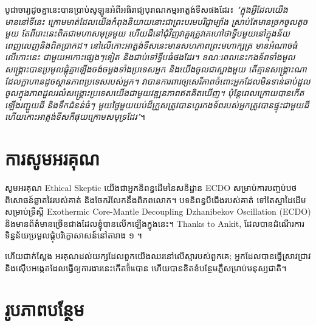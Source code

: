 \documentclass[10pt,twocolumn,letterpaper]{article}
\begin{document}
បូជាចារ្យដូចគ្នានេះបានប្រាប់សូឡូនអំពីអធិរាជ្យបុរាណកម្មអាត្លង់ទីសផងដែរ៖ \textit{"ក្នុងអ្វីដែលយើងមាននៅទីនេះ ក្រោមមាត់ដែលយើងកំពុងនិយាយនោះជាព្រះបរមបរិជ្ញាម្យ៉ាង ស្រាប់តែមានច្រកចូលតូចមួយ តែពីរោះនេះពិតជាមហាសមុទ្រមួយ ហើយដីនៅជុំវិញវាគួរត្រូវគេហៅថាទ្វីបមួយនៅក្នុងន័យពេញលេញនិងពិតប្រាកដ។ នៅលើកោះអាត្លង់ទីសនេះមានសហភាពព្រះមហាក្សត្រ មានអំណាចធំលើកោះនេះ ជាមួយឣកោះផ្សេងៗទៀត និងជាប់ទៅទ្វីបធំផងដែរ។ ខណៈពេលនេះកងទ័ពទាំងមូលសង្រ្គោះបានប្រមូលផ្តុំគ្នាឡើងចង់ចម្លងទាំងប្រទេសអ្នក និងយើងចូលជាស្អាងមួយ តើគ្មានសង្រ្គោះណាដែលក្លាហានដូចស្ថានភាពប្រទេសរបស់អ្នក។ វាបានការពារឲ្យសេរីភាពចំពោះអ្នកដែលមិនទាន់ឆាប់ដួលចូលក្នុងភាពដួលរលំសង្រ្គោះប្រទេសយើងជាមួយវឌ្ឍនភាពឥតគិតឃើញ។ ប៉ុន្តែពេលក្រោយបានកើតឡើងរញ្ជួយដី និងទឹកជំនន់ធំៗ មួយថ្ងៃមួយយប់ដ៏ក្រួសត្រូវបានហួរកងទ័ពរបស់អ្នកត្រូវបានផ្ទុះជាមួយដី ហើយកោះអាត្លង់ទីសក៏ផុយក្រោមសមុទ្រដែរ"}។

\section{ការសូមអរគុណ}

សូមអរគុណ Ethical Skeptic យើងជាអ្នកនិពន្ធដើមនៃសនិដ្ឋាន ECDO សម្រាប់ការបញ្ចប់បថពិសោធន៍ឆ្លាតវៃរបស់គាត់ និងចែករំលែកនឹងពិភពលោក។ បទនិពន្ធបីជើងរបស់គាត់ \cite{1} ទៅតែស្នាដៃដើមសម្រាប់ទ្រឹស្តី Exothermic Core-Mantle Decoupling Dzhanibekov Oscillation (ECDO) និងមានព័ត៌មានច្រើនជាងដែលខ្ញុំបានលើកឡើងក្នុងនេះ។
Thanks to Ankit, ដែលបានដំណើរការទិន្នន័យប្រមូលផ្ដុំបរិក្ខោសាសន៍នៅតារាង ១ ។

ហើយជាក់ស្តែង អរគុណដល់យក្សដែលពួកយើងឈរនៅលើស្មារបស់ពួកគេ; អ្នកដែលបានធ្វើស្រាវជ្រាវ និងស៊ើបអង្កេតដែលធ្វើឲ្យការងារនេះកើតขึ้นបាន ហើយបានខិតខំបន្ថែមភ្លឺសម្រាប់មនុស្សជាតិ។

\clearpage
\twocolumn

\section{រូបភាពបន្ថែម}
\end{document}
